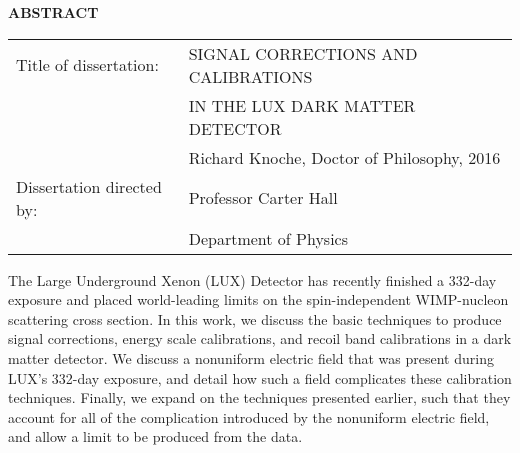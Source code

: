 \thispagestyle{plain}
\begin{center}
    \Large
    \textbf{ABSTRACT}
    
    \vspace{1cm}
    \large
    \begin{tabular}{ll}
  	Title of dissertation:& SIGNAL CORRECTIONS AND CALIBRATIONS \\[-0.5cm]
  	& IN THE LUX DARK MATTER DETECTOR \\[0.3cm]
  	& Richard Knoche, Doctor of Philosophy, 2016 \\[0.2cm]
    Dissertation directed by:& Professor Carter Hall \\[-0.5cm]
    & Department of Physics
 	\end{tabular}

	\vspace{1cm}
    \normalsize

\end{center}
    The Large Underground Xenon (LUX) Detector has recently finished a 332-day exposure and placed world-leading limits on the spin-independent WIMP-nucleon scattering cross section.  In this work, we discuss the basic techniques to produce signal corrections, energy scale calibrations, and recoil band calibrations in a dark matter detector.  We discuss a nonuniform electric field that was present during LUX's 332-day exposure, and detail how such a field complicates these calibration techniques.  Finally, we expand on the techniques presented earlier, such that they account for all of the complication introduced by the nonuniform electric field, and allow a limit to be produced from the data.

